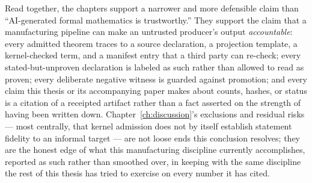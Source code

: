Read together, the chapters support a narrower and more defensible claim
than ``AI-generated formal mathematics is trustworthy.'' They support the
claim that a manufacturing pipeline can make an untrusted producer's
output \emph{accountable}: every admitted theorem traces to a source
declaration, a projection template, a kernel-checked term, and a manifest
entry that a third party can re-check; every stated-but-unproven
declaration is labeled as such rather than allowed to read as proven;
every deliberate negative witness is guarded against promotion; and every
claim this thesis or its accompanying paper makes about counts, hashes,
or status is a citation of a receipted artifact rather than a fact
asserted on the strength of having been written down. Chapter~\ref{ch:discussion}'s
exclusions and residual risks --- most centrally, that kernel admission
does not by itself establish statement fidelity to an informal target ---
are not loose ends this conclusion resolves; they are the honest edge of
what this manufacturing discipline currently accomplishes, reported as
such rather than smoothed over, in keeping with the same discipline the
rest of this thesis has tried to exercise on every number it has cited.
